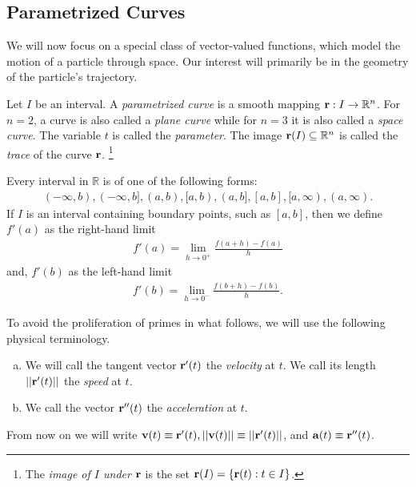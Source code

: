 \documentclass[12pt,letterpaper,reqno]{article}
\numberwithin{equation}{section}
\newcommand{\R}{\ensuremath{\mathbb R}}
\newcommand{\bv}{{\bf v}}
\newcommand{\ba}{{\bf a}}
\newcommand{\bbr}{{\bf r}}
\begin{document}
{{\begin{solution}
\end{solution}}

\newpage 

\subsection{Parametrized Curves}
We will now focus on a special class of vector-valued functions, which model the motion of a particle through space. Our interest will primarily be in the geometry of the particle's trajectory.

\begin{defn}
	Let $I$ be an interval. A \emph{parametrized curve} is a smooth mapping $\bbr:I \to \mathbb{R}^n$. For $n=2$, a curve is also called a \emph{plane curve} while for $n=3$ it is also called a \emph{space curve}. The variable $t$ is called the \emph{parameter}. The image $\bbr(I) \subseteq \R^n$ is called the \emph{trace} of the curve $\bbr$. \footnote{The \emph{image of $I$ under $\bbr$} is the set $\bbr(I)=\{\bbr(t):t \in I\}$.}
\end{defn}

\begin{remark}
Every interval in $\R$ is of one of the following forms:
\begin{align*}
	(-\infty,b), (-\infty,b], (a,b), [a,b), (a,b], [a,b],[a,\infty), (a,\infty).
\end{align*}
If $I$ is an interval containing boundary points, such as $[a,b]$, then we define $f'(a)$ as the right-hand limit
\begin{align*}
	f'(a)=\lim_{h \to 0^+}\frac{f(a+h)-f(a)}{h}
\end{align*}
and, $f'(b)$ as the left-hand limit
\begin{align*}
	f'(b)=\lim_{h \to 0^-}\frac{f(b+h)-f(b)}{h}.
\end{align*}
\end{remark}

To avoid the proliferation of primes in what follows, we will use the following physical terminology.
\begin{defn}
	\begin{enumerate}[(a)]
		\item We will call the tangent vector $\bbr'(t)$ the \emph{velocity} at $t$. We call its length $||\bbr'(t)||$ the \emph{speed} at $t$.
		\item We call the vector $\bbr''(t)$ the \emph{acceleration} at $t$.
	\end{enumerate}
	From now on we will write $\bv(t) \equiv \bbr'(t), ||\bv(t)||\equiv ||\bbr'(t)||$, and $\ba(t)\equiv \bbr''(t)$.
\end{defn}


}
\end{document}

